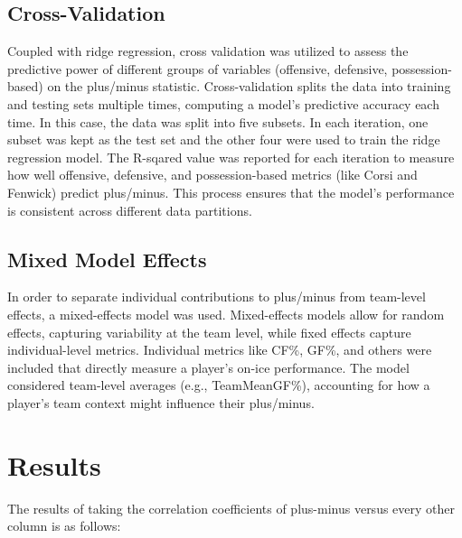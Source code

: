 \documentclass[12pt]{article}
\begin{document}
\subsection{Cross-Validation}
Coupled with ridge regression, cross validation was utilized to assess the predictive power of different groups of variables (offensive, 
defensive, possession-based) on the plus/minus statistic. Cross-validation splits the data into training and testing sets multiple times, 
computing a model's predictive accuracy each time. In this case, the data was split into five subsets. In each iteration, one subset was
kept as the test set and the other four were used to train the ridge regression model. The R-sqared value was reported for each iteration
to measure how well offensive, defensive, and possession-based metrics (like Corsi and Fenwick) predict plus/minus. This process ensures 
that the model’s performance is consistent across different data partitions.

\subsection{Mixed Model Effects}
In order to separate individual contributions to plus/minus from team-level effects, a mixed-effects model was used. Mixed-effects models 
allow for random effects, capturing variability at the team level, while fixed effects capture individual-level metrics. Individual metrics 
like CF\%, GF\%, and others were included that directly measure a player's on-ice performance. The model considered team-level averages 
(e.g., TeamMeanGF\%), accounting for how a player’s team context might influence their plus/minus.


\section{Results}
\label{sec:resu}

The results of taking the correlation coefficients of plus-minus versus every other column is as follows:
\end{document}

